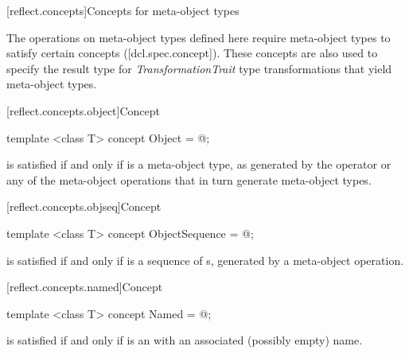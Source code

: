 [reflect.concepts]{Concepts for meta-object types}

\begin{std.txt}\color{addclr}
\pnum
The operations on meta-object types defined here require meta-object types to
satisfy certain concepts ([dcl.spec.concept]). These concepts are also used to
specify the result type for \emph{TransformationTrait} type transformations that
yield meta-object types.
\end{std.txt}

[reflect.concepts.object]{Concept }

\begin{std.txt}\color{addclr}

\begin{itemdecl}
template <class T> concept Object = @\seebelow@;
\end{itemdecl}

\begin{itemdescr}
\pnum
{} is satisfied if and only if  is a meta-object type, as generated by the  operator or any of the meta-object operations that in turn generate meta-object types.

\end{itemdescr}
\end{std.txt}

[reflect.concepts.objseq]{Concept }
\begin{std.txt}\color{addclr}

\begin{itemdecl}
template <class T> concept ObjectSequence = @\seebelow@;
\end{itemdecl}

\begin{itemdescr}
\pnum
{} is satisfied if and only if  is a sequence of s, generated by a meta-object operation.

\end{itemdescr}
\end{std.txt}

[reflect.concepts.named]{Concept }

\begin{std.txt}\color{addclr}

\begin{itemdecl}
template <class T> concept Named = @\seebelow@;
\end{itemdecl}

\begin{itemdescr}
\pnum
{} is satisfied if and only if  is an  with an associated (possibly empty) name.

\end{itemdescr}
\end{std.txt}

